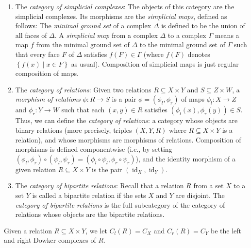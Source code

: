 \documentclass[numbers=enddot,12pt,final,onecolumn,notitlepage]{scrartcl}%
\theoremstyle{definition}
\newcommand{\id}{\operatorname{id}}
\newcommand{\set}[1]{\left\{ #1 \right\}}
\newcommand{\tup}[1]{\left( #1 \right)}
\begin{document}
\begin{enumerate}

\item The \emph{category of simplicial complexes}:
The objects of this category are the simplicial complexes.
Its morphisms are the \emph{simplicial maps}, defined as
follows:
The \emph{minimal ground set} of a complex $\Delta$ is
defined to be the union of all faces of $\Delta$.
A \emph{simplicial map} from a complex $\Delta$ to a
complex $\Gamma$ means a map $f$ from the minimal ground
set of $\Delta$ to the minimal ground set of $\Gamma$
such that every face $F$ of $\Delta$ satisfies
$f\tup{F} \in \Gamma$ (where $f\tup{F}$ denotes
$\set{f\tup{x} \mid x \in F}$ as usual).
Composition of simplicial maps is just regular composition
of maps.

\item The \emph{category of relations}:
Given two relations $R \subseteq X \times Y$ and $S \subseteq Z \times W$,
a \emph{morphism of relations} $\phi \colon R \to S$ is a pair $\phi = (\phi_l,
\phi_r)$ of maps
$\phi_l \colon X \to Z$ and $\phi_r \colon Y \to W$ such that
each $(x,y) \in R$ satisfies $(\phi_l(x), \phi_r(y)) \in S$.
Thus, we can define the \emph{category of relations}: a category whose
objects are binary relations (more precisely, triples $\tup{X, Y, R}$
where $R \subseteq X \times Y$ is a relation), and whose morphisms are
morphisms of relations.
Composition of morphisms is defined componentwise
(i.e., by setting $\tup{\phi_l, \phi_r} \circ \tup{\psi_l, \psi_r}
= \tup{\phi_l \circ \psi_l, \phi_r \circ \psi_r}$),
and the identity morphism of a given relation $R \subseteq X \times Y$
is the pair $(\id_X, \id_Y)$.

\item The \emph{category of bipartite relations}:
Recall that a relation $R$ from a set $X$ to a set $Y$ is called a
bipartite relation if the sets $X$ and $Y$ are disjoint.
The \emph{category of bipartite relations} is the full subcategory
of the category of relations whose objects are the bipartite relations.

\end{enumerate}

Given a relation $R \subseteq X \times Y$, we let
$C_l(R) = C_X$ and $C_r(R) = C_Y$ be the left and right Dowker complexes of $R$.
\end{document}

